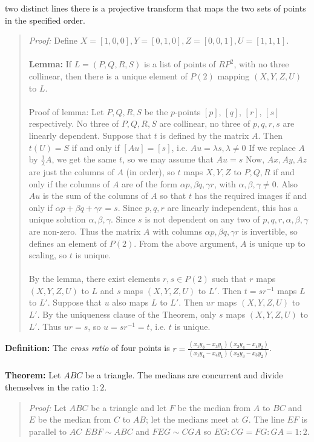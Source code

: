 two distinct lines there is a projective transform 
that maps the two sets of points in the specified order.
\begin{quote}
\emph{Proof:}
Define $X = [1,0,0], Y = [0,1,0], Z = [0,0,1], U = [1,1,1]$.
\\
\\
{\bf Lemma:}
If $L =(P,Q,R,S)$ is a list of points of $RP^2$, with no three collinear, then 
there is a unique element of $P(2)$ mapping $(X,Y,Z,U)$ to $L$.
\\
\\
Proof of lemma: Let $P, Q, R, S$ be the $p$-points $[p]$, $[q]$, $[r]$, $[s]$ respectively.
No three of $P,Q,R,S$ are collinear, no three of $p,q,r,s$ are linearly dependent.
Suppose that $t$ is defined by the matrix $A$. 
Then $t(U) = S$ if and only if $[Au] = [s]$, i.e. $Au = \lambda s, \lambda \ne 0$ 
If we replace $A$ by ${\frac 1 {\lambda}}A$, we get the same $t$, so we may assume that $Au = s$
Now, $Ax, Ay, Az$ are just the columns of $A$ (in order), so
$t$ maps $X, Y, Z$ to $P, Q, R$ if and only if the columns of $A$ are 
of the form $\alpha p, \beta q, \gamma r$, with $\alpha, \beta, \gamma \ne 0$.
Also $Au$ is the sum of the columns of $A$ so that $t$ has the required images 
if and only if $\alpha p + \beta q + \gamma r = s$.
Since $p, q, r$ are linearly independent, this has a unique solution $\alpha, \beta, \gamma$.
Since $s$ is not dependent on any two of $p, q, r, \alpha, \beta, \gamma$  are non-zero.
Thus the matrix $A$ with columns $\alpha p, \beta q, \gamma r$ is invertible, so defines an element 
of $P(2)$. From the above argument, $A$ is unique up to scaling, so $t$ is unique.
\\
\\
By the lemma, there exist elements $r, s \in  P(2) $
such that $r$ maps $(X,Y,Z,U)$ to $L$ and $s$ maps $(X,Y,Z,U)$ to $L'$.
Then $t = sr^{-1}$ maps $L$ to $L'$.
Suppose that $u$ also maps $L$ to $L'$. Then $ur$ maps $(X,Y,Z,U)$ to $L'$.
By the uniqueness clause of the Theorem, only $s$ maps $(X,Y,Z,U)$ to $L'$.
Thus $ur = s$, so $u = sr^{-1} = t$, i.e. $t$ is unique.
\end{quote}
{\bf Definition:}
The \emph{cross ratio} of four points is
$r= {\frac {(x_{1}y_{3}-x_{3}y_{1}) (x_{2}y_{4}-x_{4}y_{2})}
{ (x_{1}y_{4}-x_{4}y_{1}) (x_{2}y_{3}-x_{3}y_{2})}}$.
\\
\\
{\bf Theorem:}  Let $ABC$ be a triangle.  The medians are concurrent and divide themselves in
the ratio $1:2$.
\begin{quote}
\emph{Proof:} Let $ABC$ be a triangle and let $F$ be the median from $A$ to $BC$ and
$E$ be the median from $C$ to $AB$; let the medians meet at $G$.
The line $EF$ is parallel to $AC$ $EBF \sim ABC$ and $FEG \sim CGA$ so
$EG:CG = FG : GA = 1:2$.
\end{quote}
